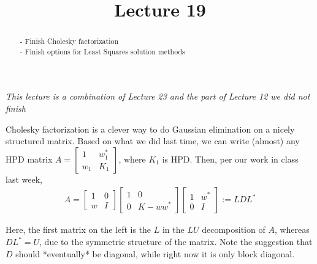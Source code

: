 \documentclass{ximera}
\begin{document}
    \title{Lecture 19}
    
    \begin{abstract} 
        - Finish Cholesky factorization \\
        - Finish options for Least Squares solution methods
    \end{abstract}
    \maketitle

\textit{This lecture is a combination of Lecture 23 and the part of Lecture 12 we did not finish}

Cholesky factorization is a clever way to do Gaussian elimination on a nicely structured matrix.  Based on what we did last time, we can write (almost) any HPD matrix $A = \begin{bmatrix}1 & w_1^* \\ w_1 & K_1\end{bmatrix}$, where $K_1$ is HPD.  Then, per our work in class last week,
\begin{align*}
    A = \begin{bmatrix}
        1 & 0 \\ w & I
    \end{bmatrix}
    \begin{bmatrix}
        1 & 0 \\ 0 & K-ww^*
    \end{bmatrix}
    \begin{bmatrix}
        1 & w^* \\
        0 & I
    \end{bmatrix}
    := LDL^*
\end{align*}

Here, the first matrix on the left is the $L$ in the $LU$ decomposition of $A$, whereas $DL^* = U$, due to the symmetric structure of the matrix.  Note the suggestion that $D$ should *eventually* be diagonal, while right now it is only block diagonal.  
\end{document}
